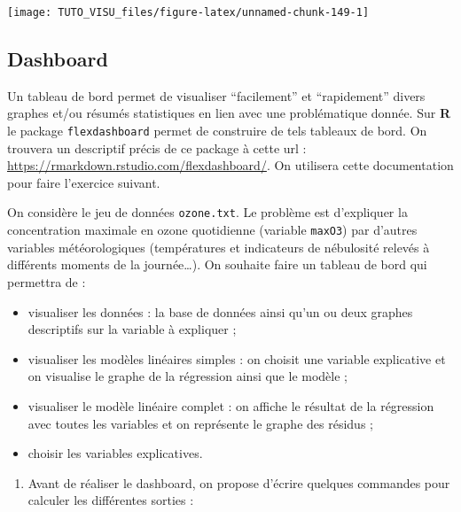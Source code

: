 \documentclass[]{article}
\providecommand{\tightlist}{%
  \setlength{\itemsep}{0pt}\setlength{\parskip}{0pt}}
\theoremstyle{definition}
\theoremstyle{definition}
\theoremstyle{definition}
\theoremstyle{remark}
\let\BeginKnitrBlock\begin \let\EndKnitrBlock\end
\begin{document}
\begin{center}\texttt{[image: TUTO\_VISU\_files/figure-latex/unnamed-chunk-149-1]} \end{center}

\hypertarget{dashboard}{%
\subsection{Dashboard}\label{dashboard}}

Un tableau de bord permet de visualiser ``facilement'' et ``rapidement'' divers graphes et/ou résumés statistiques en lien avec une problématique donnée. Sur \textbf{R} le package \texttt{flexdashboard} permet de construire de tels tableaux de bord. On trouvera un descriptif précis de ce package à cette url : \url{https://rmarkdown.rstudio.com/flexdashboard/}. On utilisera cette documentation pour faire l'exercice suivant.

\BeginKnitrBlock{exercise}[Dashboard pour modèles linéaires]
\protect\hypertarget{exr:dash-ozone}{}{\label{exr:dash-ozone} \iffalse (Dashboard pour modèles linéaires) \fi{} }
\EndKnitrBlock{exercise}

On considère le jeu de données \texttt{ozone.txt}. Le problème est d'expliquer la concentration maximale en ozone quotidienne (variable \texttt{maxO3}) par d'autres variables météorologiques (températures et indicateurs de nébulosité relevés à différents moments de la journée\ldots{}). On souhaite faire un tableau de bord qui permettra de :

\begin{itemize}
\tightlist
\item
  visualiser les données : la base de données ainsi qu'un ou deux graphes descriptifs sur la variable à expliquer ;
\item
  visualiser les modèles linéaires simples : on choisit une variable explicative et on visualise le graphe de la régression ainsi que le modèle ;
\item
  visualiser le modèle linéaire complet : on affiche le résultat de la régression avec toutes les variables et on représente le graphe des résidus ;
\item
  choisir les variables explicatives.
\end{itemize}

\begin{enumerate}
\def\labelenumi{\arabic{enumi}.}
\tightlist
\item
  Avant de réaliser le dashboard, on propose d'écrire quelques commandes pour calculer les différentes sorties :
\end{enumerate}
\end{document}
